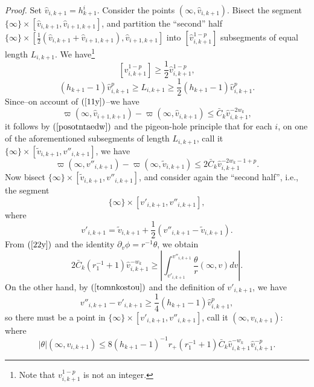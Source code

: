 \documentclass{article}
\begin{document}
\noindent\emph{Proof.} 
Set $\hat{v}_{i,k+1}=h_{k+1}^i$.
Consider the points $(\infty,\hat{v}_{i,k+1})$.
Bisect the segment $\{\infty\}\times[\hat{v}_{i,k+1},\hat{v}_{i+1,k+1}]$, 
and partition
the ``second'' half 
$\{\infty\}\times[\frac12(\hat{v}_{i,k+1}+\hat{v}_{i+1,k+1}),\hat{v}_{i+1,k+1}]$
into $[\hat{v}_{i,k+1}^{1-p}]$ subsegments of 
equal length $L_{i,k+1}$. We have\footnote{Note that $v^{1-p}_{i,k+1}$
is not an integer.}
\begin{equation}
\label{posotntaedw}
[\hat{v}^{1-p}_{i,k+1}]\ge\frac12\hat{v}^{1-p}_{i,k+1},
\end{equation}
\begin{equation}
\label{tomnkostou}
(h_{k+1}-1)\hat{v}_{i,k+1}^p\ge L_{i,k+1}\ge\frac12(h_{k+1}-1)\hat{v}_{i,k+1}^p.
\end{equation} 
Since--on account of $(\ref{11y})$--we have
\[
\varpi(\infty,\hat{v}_{i+1,k+1})-\varpi(\infty,\hat{v}_{i,k+1})\le 
\bar{C}_k\hat{v}_{i,k+1}^{-2w_k},
\]
it follows by $(\ref{posotntaedw})$ and the pigeon-hole
principle that for each $i$, on one of the aforementioned 
subsegments of length $L_{i,k+1}$,
call it $\{\infty\}\times[\tilde{v}_{i,k+1},v''_{i,k+1}]$,
we have
\begin{equation}
\label{peristeri}
\varpi(\infty,v''_{i,k+1})-\varpi(\infty,\tilde{v}_{i,k+1})
\le 2\bar{C}_k\hat{v}_{i,k+1}^{-2w_k-1+p}.
\end{equation}
Now bisect $\{\infty\}\times[\tilde{v}_{i,k+1},v''_{i,k+1}]$,
and consider again the ``second half'', i.e., the segment
\[
\{\infty\}\times[v'_{i,k+1},v''_{i,k+1}],
\]
where 
\[
v'_{i,k+1}=\tilde{v}_{i,k+1}+\frac12(v''_{i,k+1}-\tilde{v}_{i,k+1}).
\]
From $(\ref{22y})$ and the identity
$\partial_v\phi=r^{-1}\theta$,
we obtain
\[
2\bar{C}_k(r_1^{-1}+1)
\hat{v}_{i,k+1}^{-w_k}\ge\left|\int_{v'_{i,k+1}}
^{v''_{i,k+1}}
{\frac{\theta}r(\infty,v)dv}\right|.
\]
On the other hand, by $(\ref{tomnkostou})$ and the definition
of $v'_{i,k+1}$, we have
\[
v''_{i,k+1}-v'_{i,k+1}\ge\frac14(h_{k+1}-1)\hat{v}_{i,k+1}^p,
\]
so there must be a point in 
$\{\infty\}\times[v'_{i,k+1},v''_{i,k+1}]$, 
call it $(\infty,v_{i,k+1})$:
\[

\]
%
where 
\begin{equation}
\label{kalo9nta}
|\theta|(\infty,v_{i,k+1})	\le 8(h_{k+1}-1)^{-1}r_+(r_1^{-1}+1)\bar{C}_k
\hat{v}_{i,k+1}^{-w_k}\hat{v}_{i,k+1}^{-p}.
\end{equation}
\end{document}
